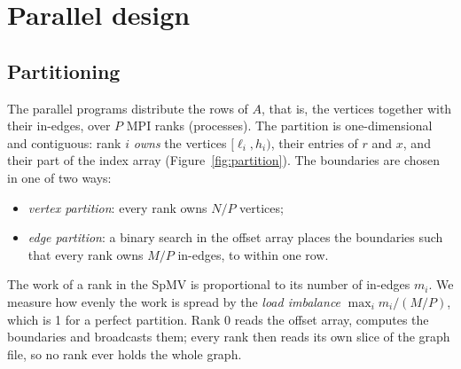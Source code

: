 \documentclass[11pt,a4paper]{article}
\begin{document}
\section{Parallel design}
\label{sec:design}

\subsection{Partitioning}

The parallel programs distribute the rows of $A$, that is, the vertices together with their in-edges, over $P$ MPI
ranks (processes). The partition is one-dimensional and contiguous: rank $i$ \emph{owns} the vertices
$[\ell_i,h_i)$, their entries of $r$ and $x$, and their part of the index array (Figure~\ref{fig:partition}). The
boundaries are chosen in one of two ways:
\begin{itemize}
\item \emph{vertex partition}: every rank owns $N/P$ vertices;
\item \emph{edge partition}: a binary search in the offset array places the boundaries such that every rank owns
  $M/P$ in-edges, to within one row.
\end{itemize}
The work of a rank in the SpMV is proportional to its number of in-edges $m_i$. We measure how evenly the work is
spread by the \emph{load imbalance} $\max_i m_i/(M/P)$, which is 1 for a perfect partition. Rank 0 reads the offset
array, computes the boundaries and broadcasts them; every rank then reads its own slice of the graph file, so no
rank ever holds the whole graph.
\end{document}
